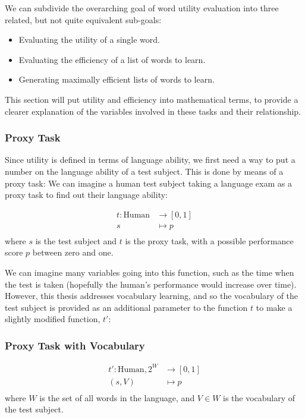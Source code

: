 We can subdivide the overarching goal of word utility evaluation into three related, but not quite equivalent sub-goals:
\begin{itemize}
	\item Evaluating the utility of a single word.
	\item Evaluating the efficiency of a list of words to learn.
	\item Generating maximally efficient lists of words to learn.
\end{itemize}

This section will put utility and efficiency into mathematical terms, to provide a clearer explanation of the variables involved in these tasks and their relationship.

\subsubsection{Proxy Task}
Since utility is defined in terms of language ability, we first need a way to put a number on the language ability of a test subject. This is done by means of a proxy task: We can imagine a human test subject taking a language exam as a proxy task to find out their language ability:

\begin{align*}
	t: \text{Human} & \to [0, 1] \\
	s & \mapsto p            \\
\end{align*}
where $s$ is the test subject and $t$ is the proxy task, with a possible performance score $p$ between zero and one.

We can imagine many variables going into this function, such as the time when the test is taken (hopefully the human's performance would increase over time). However, this thesis addresses vocabulary learning, and so the vocabulary of the test subject is provided as an additional parameter to the function $t$ to make a slightly modified function, $t'$:

\subsubsection{Proxy Task with Vocabulary}
\begin{align*}
	t': \text{Human}, 2^{W} & \to [0, 1] \\
	(s, V) & \mapsto p               \\
\end{align*}
where $W$ is the set of all words in the language, and $V \in W$ is the vocabulary of the test subject.

